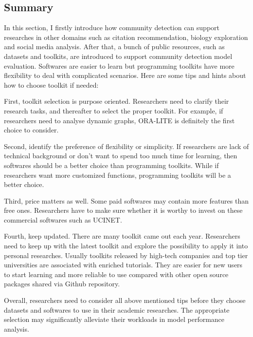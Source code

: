 \subsection{Summary}
In this section, I firstly introduce how community detection can support researches in other domains such as citation recommendation, biology exploration and social media analysis. After that, a bunch of public resources, such as datasets and toolkits, are introduced to support community detection model evaluation. Softwares are easier to learn but programming toolkits have more flexibility to deal with complicated scenarios. Here are some tips and hints about how to choose toolkit if needed: 

First, toolkit selection is purpose oriented.  Researchers need to clarify their research tasks, and thereafter to select the proper toolkit. For example, if researchers need to analyse dynamic graphs, 
ORA-LITE is definitely the first choice to consider. 

Second, identify the preference of flexibility or simplicity. If researchers are lack of technical background or don't want to spend too much time for learning, then softwares should be a better choice than programming toolkits. While if researchers want more customized functions, programming toolkits will be a better choice. 

Third, price matters as well. Some paid softwares may contain more features than free ones. Researchers have to make sure whether it is worthy to invest on these commercial softwares such as UCINET.

Fourth, keep updated. There are many toolkit came out each year. Researchers need to keep up with the latest toolkit and explore the possibility to apply it into personal researches.  Usually toolkits released by high-tech companies and top tier universities are associated with enriched tutorials. They are easier for new users to start learning and more reliable to use compared with other open source packages shared via Github repository.

Overall, researchers need to consider all above mentioned tips before they choose datasets and softwares to use in their academic researches. The appropriate selection may significantly alleviate their workloads in model performance analysis.

